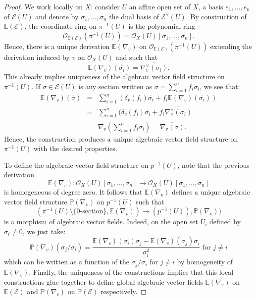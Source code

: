\documentclass[12pt]{amsart}
\renewcommand{\P}{\mathbb{P}}
\theoremstyle{definition}
\theoremstyle{plain}
\theoremstyle{exampstyle}
\theoremstyle{exampstyle}\newtheorem{thmxbis}{Theorem}
\numberwithin{equation}{section}
\theoremstyle{remark}
\begin{document}
\begin{proof} 
We work locally on $X$: consider $U$ an affine open set of $X$, a basis $e_1,\ldots, e_n$ of $\mathcal E(U)$ and denote by $\sigma_1,\ldots, \sigma_n$ the dual basis of $\mathcal E^\vee(U)$. By construction of $\mathbb{E}(\mathcal E)$, the coordinate ring on $\pi^{-1}(U)$ is the polynomial ring 
$$ \mathcal O_{\mathbb{E}(\mathcal E)}(\pi^{-1}(U))  = \mathcal O_X(U)[\overline{\sigma_1}, \ldots, \overline{\sigma_n}].$$ 
Hence, there is a unique derivation $\mathbb{E}(\nabla_v)$ on $\mathcal O_{\mathbb{E}(\mathcal E)}(\pi^{-1}(U))$ extending the derivation induced by $v$ on $\mathcal O_X(U)$ and such that 
$$ \mathbb{E}(\nabla_v)(\overline{\sigma_i}) = \overline{\nabla_v^\vee(\sigma_i)}.$$
This already implies uniqueness of the algebraic vector field structure on $\pi^{-1}(U)$. If $\sigma \in \mathcal E(U)$ is any section written as $\sigma = \sum_{i = 1}^n f_i \sigma_i$, we see that:  
\begin{eqnarray*} 
\mathbb{E}(\nabla_v)(\overline{\sigma}) & = & \sum_{i = 1}^n (\delta_v(f_i) \overline{\sigma_i} + f_i \mathbb{E}(\nabla_v)(\overline{\sigma_i})) \\
& = & \sum_{i = 1}^n (\delta_v(f_i) \overline{\sigma_i} + f_i \overline{\nabla_v^\vee(\sigma_i)} \\
& = & \overline{\nabla_v(\sum_{i = 1}^n f_i \sigma_i)} = \overline{\nabla_v(\sigma)}.
\end{eqnarray*}
Hence, the construction produces a unique algebraic vector field structure on $\pi^{-1}(U)$ with the desired properties. 

To define the algebraic vector field structure on $p^{-1}(U)$, note that the previous derivation 
$$ \mathbb E(\nabla_v) : \mathcal O_X(U)[\overline{\sigma_1}, \ldots, \overline{\sigma_n}] \rightarrow \mathcal O_X(U)[\overline{\sigma_1}, \ldots, \overline{\sigma_n}] $$ 
is homogeneous of degree zero. It follows that $\mathbb{E}(\nabla_v)$ defines a unique algebraic vector field structure $\P(\nabla_v)$ on $p^{-1}(U)$ such that 
$$ (\pi^{-1}(U) \setminus \lbrace 0\text{-section} \rbrace,  \mathbb{E}(\nabla_v)) \rightarrow (p^{-1}(U)) , \P(\nabla_v))$$
is a morphism of algebraic vector fields. Indeed, on the open set $U_i$ defined by $\sigma_i \neq 0$, we just take: 
$$ \P(\nabla_v)(\sigma_j/\sigma_i) = \frac {\mathbb{E}(\nabla_v)(\sigma_i) \sigma_j - \mathbb{E}(\nabla_v)(\sigma_j) \sigma_i} {\sigma_i^2} \text{ for }j \neq i $$ 
which can be written as a function of the $\sigma_j/\sigma_i$ for $j \neq i$ by homogeneity of $\mathbb{E}(\nabla_v)$. Finally, the uniqueness of the constructions implies that this local constructions glue together to define global algebraic vector fields $\mathbb{E}(\nabla_v)$ on $\mathbb{E}(\mathcal E)$ and $\mathbb{P}(\nabla_v)$ on $\mathbb{P}(\mathcal E)$ respectively. 
\end{proof} 
\end{document}
